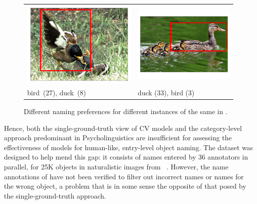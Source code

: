 \begin{figure}[t]
	\centering
	\small
	\begin{tabular}{p{3cm}p{3cm}}
		\centering
		\includegraphics[scale=0.15]{images/2327551_2960743_seed_ambiguous.png} &
		\includegraphics[scale=0.15]{images/2358126_805887_singleton_obj.png}\\
		bird\ (27),  duck\ (8) & duck (33), bird (3)\\
	\end{tabular}
	\caption{Different naming preferences for different instances of the same \category {} in \mn.\label{fig:duck}}
\end{figure}
Hence, both the single-ground-truth view of CV models and the category-level approach predominant in Psycholinguistics are insufficient for assessing the effectiveness of \lv models for human-like, entry-level object naming.
The \mn dataset was designed to help mend this gap: it consists of names entered by 36 annotators in parallel, for 25K objects in naturalistic images from \vg~\cite{krishna2016visualgenome}.
However, the name annotations of \mn have not been verified to filter out incorrect names or names for the wrong object, a problem that is in some sense the opposite of that posed by the single-ground-truth approach.

